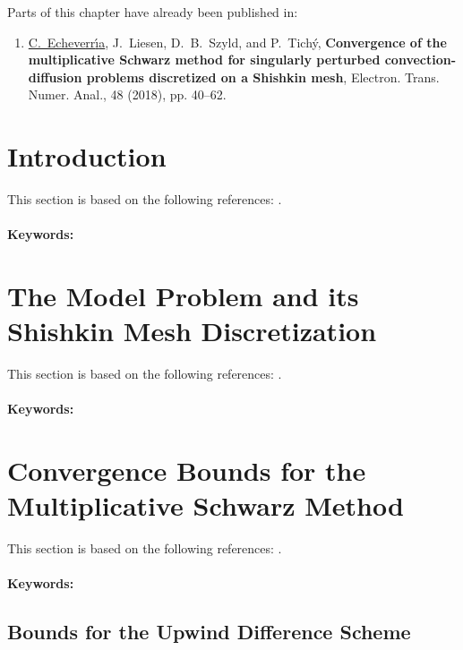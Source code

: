 \ifnum{}
Parts of this chapter have already been published in:
\begin{enumerate}
\item[\cite{EchLieSzyTic18}] \underline{C.~Echeverr{\'\i}a}, J.~Liesen, D.~B.~Szyld, and P.~Tich{\'y}, \textbf{Convergence of the multiplicative Schwarz method for singularly perturbed convection-diffusion problems discretized on a Shishkin mesh}, Electron. Trans. Numer. Anal., 48 (2018), pp. 40--62.
\end{enumerate}


\section{Introduction}
This section is based on the following references: \cite{EchLieSzyTic18, GriDolSil15}.
\paragraph{Keywords:}


\section{The Model Problem and its Shishkin Mesh Discretization}
This section is based on the following references: \cite{GriDolSil15}.
\paragraph{Keywords:}


\section{Convergence Bounds for the Multiplicative Schwarz Method}
This section is based on the following references: \cite{EchLieSzyTic18}.
\paragraph{Keywords:}

\subsection{Bounds for the Upwind Difference Scheme}

